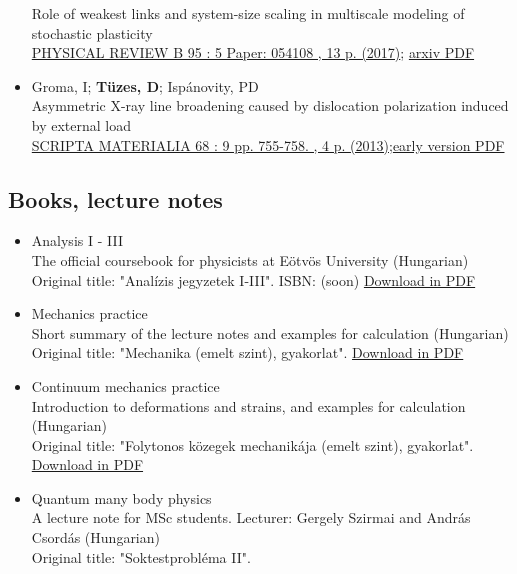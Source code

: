 \documentclass[11pt,a4paper,sans]{moderncv}        %
\begin{document}
\begin{itemize}
    Role of weakest links and system-size scaling in multiscale modeling of stochastic plasticity\\
    \href{https://journals.aps.org/prb/abstract/10.1103/PhysRevB.95.054108}{PHYSICAL REVIEW B 95 : 5 Paper: 054108 , 13 p. (2017)};
    \href{https://arxiv.org/pdf/1604.01645}{arxiv PDF}
\item Groma, I; \textbf{Tüzes, D}; Ispánovity, PD\\
    Asymmetric X-ray line broadening caused by dislocation polarization induced by external load\\
    \href{https://www.sciencedirect.com/science/article/pii/S1359646213000110}{SCRIPTA MATERIALIA 68 : 9 pp. 755-758. , 4 p. (2013)};\href{http://metal.elte.hu/~tuzes/docs/pre\%20AsymmetricX-ray\%20line\%20broadening\%20caused\%20by\%20dislocation\%20polarization\%20induced\%20by\%20external\%20load.pdf}{early version PDF}
\end{itemize}
    
\subsection{Books, lecture notes}
\begin{itemize}
\item Analysis I - III\\The official coursebook for physicists at Eötvös University (Hungarian)
\\Original title: "Analízis jegyzetek I-III". ISBN: (soon) \href{http://web.cs.elte.hu/~tarcsay/analizis-jegyzetek.pdf}{Download in PDF}

\item Mechanics practice\\
Short summary of the lecture notes and examples for calculation (Hungarian)\\
Original title: "Mechanika (emelt szint), gyakorlat". \href{https://metalog.elte.hu/nextcloud/index.php/s/AKqe8ZxjCswPrJE}{Download in PDF}

\item Continuum mechanics practice\\
Introduction to deformations and strains, and examples for calculation (Hungarian)\\
Original title: "Folytonos közegek mechanikája (emelt szint), gyakorlat". \href{https://metalog.elte.hu/nextcloud/index.php/s/QcPbMpB6cR6MsNE}{Download in PDF}

\item Quantum many body physics\\
A lecture note for MSc students. Lecturer: Gergely Szirmai and András Csordás (Hungarian)\\
Original title: "Soktestprobléma II".
\end{itemize}
\end{document}
